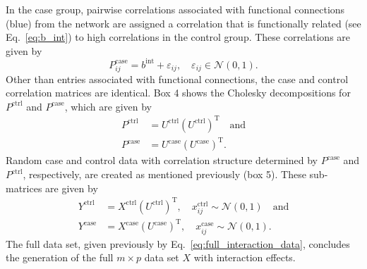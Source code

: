 \documentclass[10pt,letterpaper]{article}\usepackage[]{graphicx}\usepackage[]{color}
\begin{document}
In the case group, pairwise correlations associated with functional connections (\textcolor{blue!80}{blue}) from the network are assigned a correlation that is functionally related (see Eq.~\ref{eq:b_int}) to high correlations in the control group. These correlations are given by
\begin{equation}\label{eq:case_connected_corrs}
P^\text{case}_{ij} = b^\text{int} + \varepsilon_{ij}, \quad \varepsilon_{ij} \in \mathcal{N}(0,1).
\end{equation}
Other than entries associated with functional connections, the case and control correlation matrices are identical. Box 4 shows the Cholesky decompositions for $P^\text{ctrl}$ and $P^\text{case}$, which are given by
\begin{equation}\label{eq:cholesky_decomp}
\begin{aligned}
P^\text{ctrl} &= U^\text{ctrl} \left(U^\text{ctrl}\right)^\text{T} \quad \text{and}\\
P^\text{case} &= U^\text{case} \left(U^\text{case}\right)^\text{T}.
\end{aligned}
\end{equation}
Random case and control data with correlation structure determined by $P^\text{case}$ and $P^\text{ctrl}$, respectively, are created as mentioned previously (box 5). These sub-matrices are given by
\begin{equation}\label{eq:case_control_sub-mats}
\begin{aligned}
Y^\text{ctrl} &= X^\text{ctrl} \left(U^\text{ctrl}\right)^\text{T}, \quad x^\text{ctrl}_{ij} \sim \mathcal{N}(0,1) \quad \text{and}\\
Y^\text{case} &= X^\text{case} \left(U^\text{case}\right)^\text{T}, \quad x^\text{case}_{ij} \sim \mathcal{N}(0,1).
\end{aligned}
\end{equation}
The full data set, given previously by Eq.~\ref{eq:full_interaction_data}, concludes the generation of the full $m \times p$ data set $X$ with interaction effects.

\end{document}
